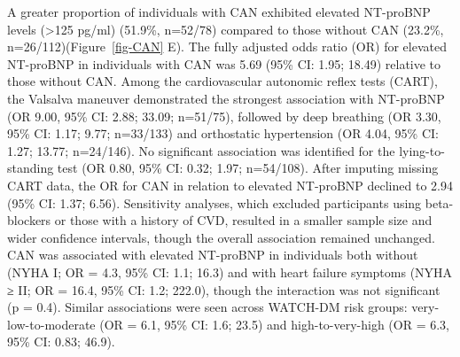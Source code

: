 \documentclass[
  a4paper,
  headsepline=true,
  open=any]{scrbook}
\begin{document}
A greater proportion of individuals with CAN exhibited elevated
NT-proBNP levels (\textgreater125 pg/ml) (51.9\%, n=52/78) compared to
those without CAN (23.2\%, n=26/112)(Figure~\ref{fig-CAN} E). The fully
adjusted odds ratio (OR) for elevated NT-proBNP in individuals with CAN
was 5.69 (95\% CI: 1.95; 18.49) relative to those without CAN. Among the
cardiovascular autonomic reflex tests (CART), the Valsalva maneuver
demonstrated the strongest association with NT-proBNP (OR 9.00, 95\% CI:
2.88; 33.09; n=51/75), followed by deep breathing (OR 3.30, 95\% CI:
1.17; 9.77; n=33/133) and orthostatic hypertension (OR 4.04, 95\% CI:
1.27; 13.77; n=24/146). No significant association was identified for
the lying-to-standing test (OR 0.80, 95\% CI: 0.32; 1.97; n=54/108).
After imputing missing CART data, the OR for CAN in relation to elevated
NT-proBNP declined to 2.94 (95\% CI: 1.37; 6.56). Sensitivity analyses,
which excluded participants using beta-blockers or those with a history
of CVD, resulted in a smaller sample size and wider confidence
intervals, though the overall association remained unchanged. CAN was
associated with elevated NT-proBNP in individuals both without (NYHA I;
OR = 4.3, 95\% CI: 1.1; 16.3) and with heart failure symptoms (NYHA ≥
II; OR = 16.4, 95\% CI: 1.2; 222.0), though the interaction was not
significant (p = 0.4). Similar associations were seen across WATCH-DM
risk groups: very-low-to-moderate (OR = 6.1, 95\% CI: 1.6; 23.5) and
high-to-very-high (OR = 6.3, 95\% CI: 0.83; 46.9).
\end{document}
